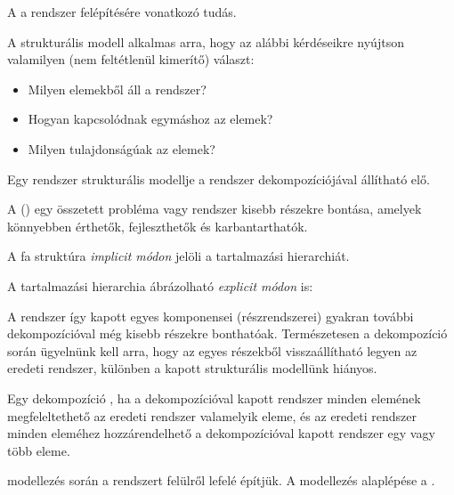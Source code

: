 \begin{definicio}
A  a rendszer felépítésére vonatkozó tudás.
\end{definicio}

A strukturális modell alkalmas arra, hogy az alábbi kérdéseikre nyújtson valamilyen (nem feltétlenül kimerítő) választ:

\begin{itemize}
\item Milyen elemekből áll a rendszer?
\item Hogyan kapcsolódnak egymáshoz az elemek?
\item Milyen tulajdonságúak az elemek?
\end{itemize}

Egy rendszer strukturális modellje a rendszer dekompozíciójával állítható elő.

\begin{definicio}
	A  () egy összetett probléma vagy rendszer kisebb részekre bontása, amelyek könnyebben érthetők, fejleszthetők és karbantarthatók.
\end{definicio}


\begin{megjegyzes}
A fa struktúra \emph{implicit módon} jelöli a tartalmazási hierarchiát.

A tartalmazási hierarchia ábrázolható \emph{explicit módon} is: 

\end{megjegyzes}

A rendszer így kapott egyes komponensei (részrendszerei) gyakran további dekompozícióval még kisebb részekre bonthatóak. Természetesen a dekompozíció során ügyelnünk kell arra, hogy az egyes részekből visszaállítható legyen az eredeti rendszer, különben a kapott strukturális modellünk hiányos.

\begin{definicio}
	Egy dekompozíció , ha a dekompozícióval kapott rendszer minden elemének megfeleltethető az eredeti rendszer valamelyik eleme, és az eredeti rendszer minden eleméhez hozzárendelhető a dekompozícióval kapott rendszer egy vagy több eleme.
\end{definicio}

\begin{definicio}
	 modellezés során a rendszert felülről lefelé építjük. A modellezés alaplépése a .
\end{definicio}


